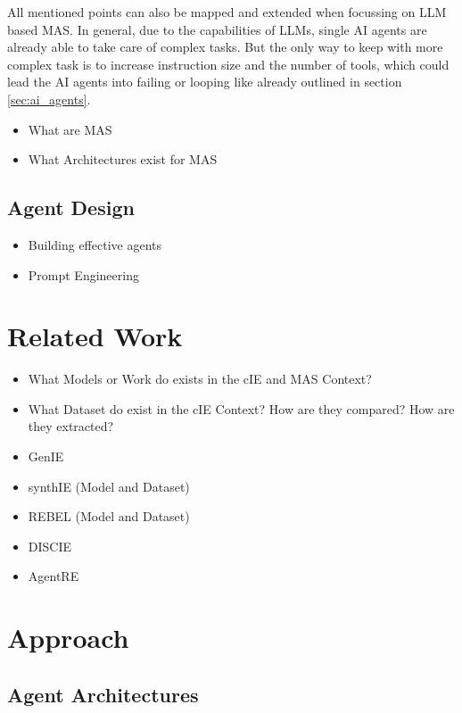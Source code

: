 \documentclass[a4paper,oneside,bibliography=totoc]{scrbook}
\begin{document}
All mentioned points can also be mapped and extended when focussing on \ac{LLM} based \ac{MAS}. In general, due to the capabilities of \acp{LLM}, single \ac{AI} agents are already able to take care of complex tasks. But the only way to keep with more complex task is to increase instruction size and the number of tools, which could lead the \ac{AI} agents into failing or looping like already outlined in section \ref{sec:ai_agents}.

\begin{itemize}
  \item What are \ac{MAS}
  \item What Architectures exist for MAS
\end{itemize}
\section{Agent Design}
\label{sec:agent_design}
\begin{itemize}
  \item Building effective agents \cite{Anthropic2024}
  \item Prompt Engineering \cite{Schulhoff2025}
\end{itemize}

\chapter{Related Work}
\label{ch:related_work_chapter}
\begin{itemize}
  \item What Models or Work do exists in the cIE and MAS Context?
  \item What Dataset do exist in the cIE Context? How are they compared? How are they extracted?
  \item GenIE \cite{Josifoski2021}
  \item synthIE (Model and Dataset) \cite{Josifoski2023}
  \item REBEL (Model and Dataset) \cite{HuguetCabot2021}
  \item DISCIE \cite{Moeller2024}
  \item AgentRE \cite{Shi2024}
\end{itemize}


\chapter{Approach}
\label{ch:approach}
\section{Agent Architectures}
\label{sec:agent_architectures}
\end{document}
